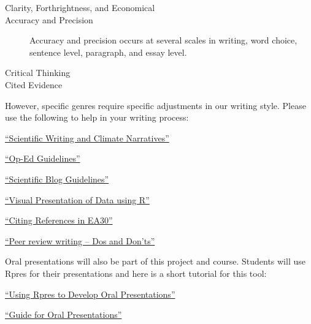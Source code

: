 \documentclass{article}\usepackage[]{graphicx}\usepackage[]{color}
\newenvironment{itemize*}%
  {\begin{itemize}%
    \setlength{\itemsep}{0pt}%
    \setlength{\parskip}{0pt}}%
  {\end{itemize}}
\begin{document}
\begin{description}
  \item[Clarity, Forthrightness, and Economical]
  \item[Accuracy and Precision] Accuracy and precision occurs at several scales in writing, word choice, sentence level, paragraph, and essay level. 
  \item[Critical Thinking]
  \item[Cited Evidence]
\end{description}

However, specific genres require specific adjustments in our writing style. Please use the following to help in your writing process:

\begin{itemize*}
  \item \href{https://github.com/marclos/Climate_Change_Narratives/raw/master/Communication_Resources/Writing_About_Climate.pdf}{``Scientific Writing and Climate Narratives''}

  \item \href{https://github.com/marclos/Climate_Change_Narratives/raw/master/Communication_Resources/Op-Ed_Guidelines.pdf}{``Op-Ed Guidelines''}
  
  \item \href{https://github.com/marclos/Climate_Change_Narratives/raw/master/Communication_Resources/Scientific_Blog_Guidelines.pdf}{``Scientific Blog Guidelines''}
  
  
  \item \href{https://github.com/marclos/Climate_Change_Narratives/raw/master/Communication_Resources/Visualing_Data.pdf}{``Visual Presentation of Data using R''}
  
  \item \href{https://github.com/marclos/Climate_Change_Narratives/raw/master/Communication_Resources/Citing_Sources.pdf}{``Citing References in EA30''}
  
  \item \href{https://github.com/marclos/Climate_Change_Narratives/raw/master/Communication_Resources/Peer_Review-Dos_and_Donts.pdf}{``Peer review writing -- Dos and Don'ts''}
\end{itemize*}

Oral presentations will also be part of this project and course. Students will use Rpres for their presentations and here is a short tutorial for this tool:

\begin{itemize*}
  \item \href{https://github.com/marclos/Climate_Change_Narratives/raw/master/Communication_Resources/TBD.pdf}{``Using Rpres to Develop Oral Presentations''}
  
  \item \href{https://github.com/marclos/Climate_Change_Narratives/raw/master/Communication_Resources/TBD.pdf}{``Guide for Oral Presentations''}
\end{itemize*}
\end{document}
